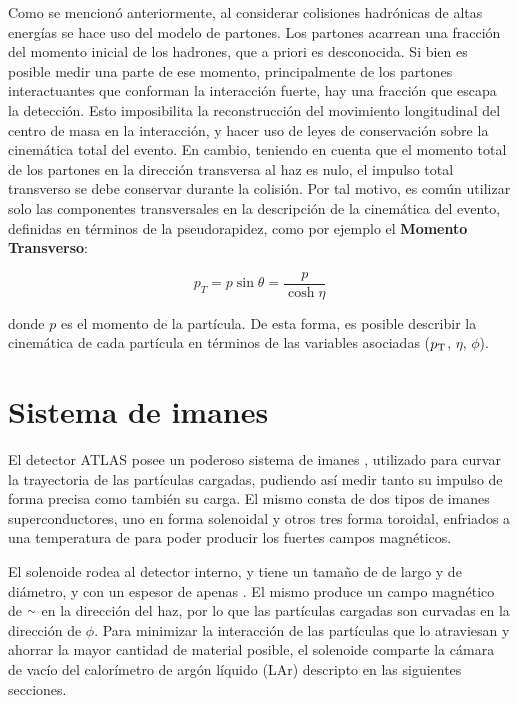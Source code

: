 
Como se mencionó anteriormente, al considerar colisiones hadrónicas de altas energías se hace uso del modelo de partones. Los partones acarrean una fracción del momento inicial de los hadrones, que a priori es desconocida. Si bien es posible medir una parte de ese momento, principalmente de los partones interactuantes que conforman la interacción fuerte, hay una fracción que escapa la detección. Esto imposibilita la reconstrucción del movimiento longitudinal del centro de masa en la interacción, y hacer uso de leyes de conservación sobre la cinemática total del evento. En cambio, teniendo en cuenta que el momento total de los partones en la dirección transversa al haz es nulo, el impulso total transverso se debe conservar durante la colisión. Por tal motivo, es común utilizar solo las componentes transversales en la descripción de la cinemática del evento, definidas en términos de la pseudorapidez, como por ejemplo el \textbf{Momento Transverso}:

\begin{equation}
p_{T}=p\sin\theta=\frac{p}{\cosh{\eta}}
\end{equation}

\noindent
donde $p$ es el momento de la partícula. De esta forma, es posible describir la cinemática de cada partícula en términos de las variables asociadas ($p_{\text{T}}$, $\eta$, $\phi$).

\section{Sistema de imanes}

El detector ATLAS posee un poderoso sistema de imanes \cite{tenKate:409763}, utilizado para curvar la trayectoria de las partículas cargadas, pudiendo así medir tanto su impulso de forma precisa como también su carga. El mismo consta de dos tipos de imanes superconductores, uno en forma solenoidal y otros tres forma toroidal, enfriados a una temperatura de  para poder producir los fuertes campos magnéticos.

El solenoide rodea al detector interno, y tiene un tamaño de  de largo y  de diámetro, 
y con un espesor de apenas . El mismo produce un campo magnético de {$\smallsim$} en la dirección del haz, por lo que las partículas cargadas son curvadas en la dirección de $\phi$. Para minimizar la interacción de las partículas que lo atraviesan y ahorrar la mayor cantidad de material posible, el solenoide comparte la cámara de vacío del calorímetro de argón líquido (LAr) descripto en las siguientes secciones.

